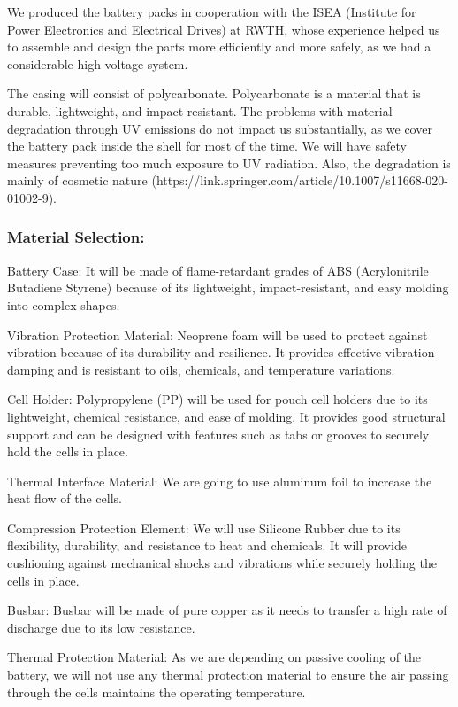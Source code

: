 We produced the battery packs in cooperation with the ISEA (Institute for Power Electronics and Electrical Drives) at RWTH, whose experience helped us to assemble and design the parts more efficiently and more safely, as we had a considerable high voltage system.

The casing will consist of polycarbonate. Polycarbonate is a material that is durable, lightweight, and impact resistant. The problems with material degradation through UV emissions do not impact us substantially, as we cover the battery pack inside the shell for most of the time. We will have safety measures preventing too much exposure to UV radiation. Also, the degradation is mainly of cosmetic nature (https://link.springer.com/article/10.1007/s11668-020-01002-9).

\subsubsection{Material Selection:}
Battery Case: It will be made of flame-retardant grades of ABS (Acrylonitrile Butadiene Styrene) because of its lightweight, impact-resistant, and easy molding into complex shapes.

Vibration Protection Material: Neoprene foam will be used to protect against vibration because of its durability and resilience. It provides effective vibration damping and is resistant to oils, chemicals, and temperature variations.

Cell Holder: Polypropylene (PP) will be used for pouch cell holders due to its lightweight, chemical resistance, and ease of molding. It provides good structural support and can be designed with features such as tabs or grooves to securely hold the cells in place.

Thermal Interface Material: We are going to use aluminum foil to increase the heat flow of the cells.

Compression Protection Element: We will use Silicone Rubber due to its flexibility, durability, and resistance to heat and chemicals. It will provide cushioning against mechanical shocks and vibrations while securely holding the cells in place.

Busbar: Busbar will be made of pure copper as it needs to transfer a high rate of discharge due to its low resistance.

Thermal Protection Material: As we are depending on passive cooling of the battery, we will not use any thermal protection material to ensure the air passing through the cells maintains the operating temperature.

